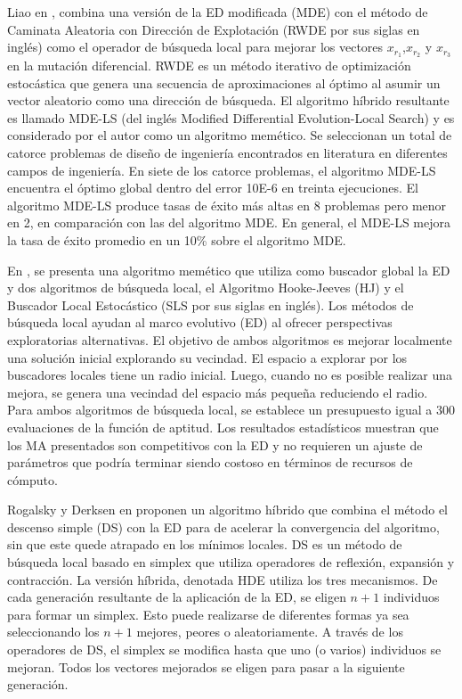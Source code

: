  Liao en \cite{liao2010two}, combina una versión de la ED modificada (MDE) con el método de Caminata Aleatoria con Dirección de Explotación (RWDE por sus siglas en inglés) como el operador de búsqueda local para mejorar los vectores $x_{r_1}$,$x_{r_2}$ y $x_{r_3}$ en la mutación diferencial. RWDE es un método iterativo de optimización estocástica que genera una secuencia de aproximaciones al óptimo al asumir un vector aleatorio como una dirección de búsqueda. El algoritmo híbrido resultante es llamado MDE-LS (del inglés Modified Differential Evolution-Local Search) y es considerado por el autor como un algoritmo memético. Se seleccionan un total de catorce problemas de diseño de ingeniería encontrados en literatura en diferentes campos de ingeniería. En siete de los catorce problemas, el algoritmo MDE-LS encuentra el óptimo global dentro del error 10E-6 en treinta ejecuciones. El algoritmo MDE-LS produce tasas de éxito más altas en 8 problemas pero menor en 2, en comparación con las del algoritmo MDE. En general, el MDE-LS mejora la tasa de éxito promedio en un 10\% sobre el algoritmo MDE.



En \cite{neri2008memetic}, se presenta una algoritmo memético que utiliza como buscador global la ED y dos algoritmos de búsqueda local, el Algoritmo Hooke-Jeeves (HJ) y el Buscador Local Estocástico (SLS por sus siglas en inglés). Los métodos de búsqueda local ayudan al marco evolutivo (ED) al ofrecer perspectivas exploratorias alternativas. El objetivo de ambos algoritmos es mejorar localmente una solución inicial explorando su vecindad. El espacio a explorar por los buscadores locales tiene un radio inicial. Luego, cuando no es posible  realizar una mejora, se genera una vecindad del espacio más pequeña reduciendo el radio. Para ambos algoritmos de búsqueda local, se establece un presupuesto igual a 300 evaluaciones de la función de aptitud. Los resultados estadísticos muestran que los MA presentados son competitivos con la ED y no requieren un ajuste de parámetros que podría terminar siendo costoso en términos de recursos de cómputo. 

Rogalsky y Derksen en \cite{rogalsky2000hybridization} proponen un algoritmo híbrido que combina el método el descenso simple (DS) con la ED para de acelerar la convergencia del algoritmo, sin que este quede atrapado en los mínimos locales.
DS es un método de búsqueda local basado en simplex que utiliza operadores de reflexión, expansión y contracción. La versión híbrida, denotada HDE utiliza los tres mecanismos.
De cada generación resultante de la aplicación de la ED, se eligen $ n + 1 $ individuos para formar un simplex. Esto puede realizarse de diferentes formas ya sea seleccionando los $n+1$ mejores, peores o aleatoriamente. A través de los operadores de DS, el simplex se modifica hasta que uno (o varios) individuos se mejoran. Todos los vectores mejorados se eligen para pasar a la siguiente generación. 

